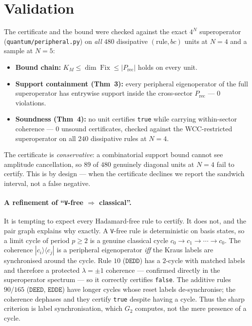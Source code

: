 \documentclass[11pt]{article}
\newcommand{\rt}[1]{\texttt{#1}}
\newcommand{\fn}[1]{\texttt{#1}}
\providecommand{\ket}[1]{|#1\rangle}
\providecommand{\bra}[1]{\langle #1|}
\newcommand{\Fix}{\operatorname{Fix}}
\newcommand{\Prec}{P_{\mathrm{rec}}}
\newcommand{\GG}{G_2}
\theoremstyle{plain}
\theoremstyle{definition}
\begin{document}
\section{Validation}
The certificate and the bound were checked against the exact $4^N$ superoperator
(\fn{quantum/peripheral.py}) on \emph{all} $480$ dissipative $(\text{rule},bc)$
units at $N=4$ and a sample at $N=5$:
\begin{itemize}
  \item \textbf{Bound chain:} $K_M\le\dim\Fix\le|\Prec|$ holds on every unit.
  \item \textbf{Support containment (Thm~3):} every peripheral eigenoperator of
  the full superoperator has entrywise support inside the cross-sector $\Prec$
  --- $0$ violations.
  \item \textbf{Soundness (Thm~4):} no unit certifies \rt{true} while carrying
  within-sector coherence --- $0$ unsound certificates, checked against the
  WCC-restricted superoperator on all $240$ dissipative rules at $N=4$.
\end{itemize}
The certificate is \emph{conservative}: a combinatorial support bound cannot see
amplitude cancellation, so $89$ of $480$ genuinely diagonal units at $N=4$ fail
to certify. This is by design --- when the certificate declines we report the
sandwich interval, not a false negative.

\paragraph{A refinement of ``\rt{V}-free $\Rightarrow$ classical''.} It is
tempting to expect every Hadamard-free rule to certify. It does not, and the pair
graph explains why exactly. A \rt{V}-free rule is deterministic on basis states,
so a limit cycle of period $p\ge 2$ is a genuine classical cycle
$c_0\to c_1\to\cdots\to c_0$. The coherence $\ket{c_i}\bra{c_j}$ is a peripheral
eigenoperator \emph{iff} the Kraus labels are synchronised around the cycle. Rule
$10$ ($\rt{DEDD}$) has a $2$-cycle with matched labels and therefore a protected
$\lambda=\pm1$ coherence --- confirmed directly in the superoperator spectrum ---
so it correctly certifies \rt{false}. The additive rules $90/165$ ($\rt{DEED}$,
$\rt{EDDE}$) have longer cycles whose reset labels de-synchronise; the coherence
dephases and they certify \rt{true} despite having a cycle. Thus the sharp
criterion is label synchronisation, which $\GG$ computes, not the mere presence
of a cycle.
\end{document}
